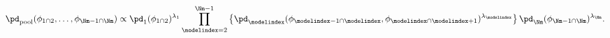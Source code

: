 \begin{equation}
  \pd_{\text{pool}} (\phi_{1 \cap 2}, \ldots, \phi_{\Nm - 1 \cap \Nm}) \propto
  \pd_{1}(\phi_{1 \cap 2})^{\lambda_{1}} 
  \prod_{\modelindex = 2}^{\Nm - 1} \left\{
    \pd_{\modelindex}(\phi_{\modelindex - 1 \cap \modelindex}, \phi_{\modelindex \cap \modelindex + 1})^{\lambda_{\modelindex}}
  \right\}
  \pd_{\Nm}(\phi_{\Nm - 1 \cap \Nm})^{\lambda_{\Nm}}.
  \label{eqn:pooled-prior-overall-general}
\end{equation}